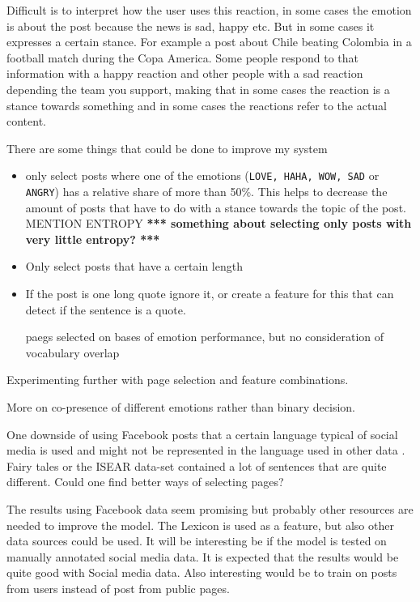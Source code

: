 \documentclass[11pt]{article}
\newcommand{\note}[1]{\textbf{*** #1 ***}}
\begin{document}
Difficult is to interpret how the user uses this reaction, in some cases the emotion is about the post because the news is sad, happy etc. But in some cases it expresses a certain stance. For example a post about Chile beating Colombia in a football match during the Copa America. Some people respond to that information with a happy reaction and other people with a sad reaction depending the team you support, making that in some cases the reaction is a stance towards something and in some cases the reactions refer to the actual content.





There are some things that could be done to improve my system
\begin{itemize}
\item only select posts where one of the emotions (\texttt{LOVE, HAHA, WOW, SAD} or \texttt{ANGRY}) has a relative share of more than 50\%. This helps to decrease the amount of posts that have to do with a stance towards the topic of the post. MENTION ENTROPY \note{something about selecting only posts with very little entropy?} 
\item Only select posts that have a certain length
\item If the post is one long quote ignore it, or create a feature for this that can detect if the sentence is a quote.

paegs selected on bases of emotion performance, but no consideration of vocabulary overlap
\end{itemize}

Experimenting further with page selection and feature combinations.

More on co-presence of different emotions rather than binary decision.

One downside of using Facebook posts that a certain language typical of social media is used and might not be represented in the language used in other data . Fairy tales or the ISEAR data-set contained a lot of sentences that are quite different. Could one find better ways of selecting pages?



The results using Facebook data seem promising but probably other resources are needed to improve the model. The Lexicon is used as a feature, but also other data sources could be used. It will be interesting be if the model is tested on manually annotated social media data. It is expected that the results would be quite good with Social media data. Also interesting would be to train on posts from users instead of post from public pages.


%


\end{document}

